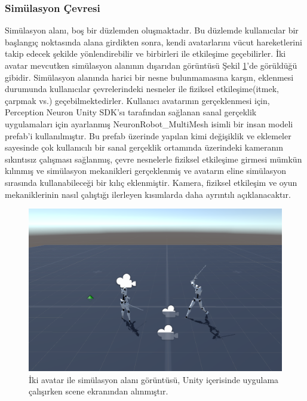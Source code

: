 \documentclass[a4paper, 12pt, titlepage]{article}
\begin{document}
\subsubsection{Simülasyon Çevresi}

Simülasyon alanı, boş bir düzlemden oluşmaktadır. Bu düzlemde kullanıcılar bir başlangıç noktasında
alana girdikten sonra, kendi avatarlarını vücut hareketlerini takip edecek şekilde yönlendirebilir
ve birbirleri ile etkileşime geçebilirler. İki avatar mevcutken simülasyon alanının dışarıdan
görüntüsü Şekil \ref{env}’de görüldüğü gibidir. Simülasyon alanında harici bir nesne bulunmamasına
karşın, eklenmesi durumunda kullanıcılar çevrelerindeki nesneler ile fiziksel etkileşime(itmek,
çarpmak vs.) geçebilmektedirler. Kullanıcı avatarının gerçeklenmesi için, Perception Neuron Unity
SDK’sı tarafından sağlanan sanal gerçeklik uygulamaları için ayarlanmış NeuronRobot\_MultiMesh isimli
bir insan modeli prefab’i kullanılmıştır. Bu prefab üzerinde yapılan kimi değişiklik ve eklemeler
sayesinde çok kullanıcılı bir sanal gerçeklik ortamında üzerindeki kameranın sıkıntısız çalışması
sağlanmış, çevre nesnelerle fiziksel etkileşime girmesi mümkün kılınmış ve simülasyon mekanikleri
gerçeklenmiş ve avatarın eline simülasyon sırasında kullanabileceği bir kılıç eklenmiştir. Kamera,
fiziksel etkileşim ve oyun mekaniklerinin nasıl çalıştığı ilerleyen kısımlarda daha ayrıntılı
açıklanacaktır.

\begin{figure}[ht!]
    \centering
        \includegraphics[width=6in]{images/env}
    \caption{İki avatar ile simülasyon alanı görüntüsü, Unity içerisinde uygulama çalışırken scene
             ekranından alınmıştır.}
    \label{env}
\end{figure}
\end{document}
